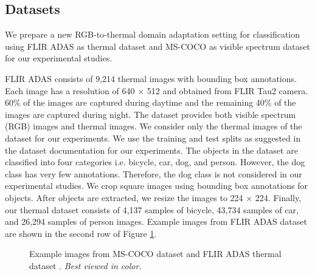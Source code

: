 \documentclass[final]{cvpr}
\begin{document}
\subsection{Datasets}

We prepare a new RGB-to-thermal domain adaptation setting for classification using FLIR ADAS \cite{flir} as thermal dataset and MS-COCO \cite{mscoco} as visible spectrum dataset for our experimental studies.
\vspace{2mm}

\begin{figure*}[ht]
\centering
    \vspace{3mm}
    \caption{The network architectures used for our experimental analyses.}
    \label{fig:architecture}
\end{figure*}

FLIR ADAS \cite{flir} consists of 9,214 thermal images with bounding box annotations. Each image has a resolution of 640 $ \times $ 512 and obtained from FLIR Tau2 camera. 60\% of the images are captured during daytime and the remaining 40\% of the images are captured during night. The dataset provides both visible spectrum (RGB) images and thermal images. We consider only the thermal images of the dataset for our experiments. We use the training and test splits as suggested in the dataset documentation for our experiments. The objects in the dataset are classified into four categories i.e. bicycle, car, dog, and person. However, the dog class has very few annotations. Therefore, the dog class is not considered in our experimental studies. We crop square images using bounding box annotations for objects. After objects are extracted, we resize the images to 224 $ \times $ 224. Finally, our thermal dataset consists of 4,137 samples of bicycle, 43,734 samples of car, and 26,294 samples of person images. Example images from FLIR ADAS dataset are shown in the second row of Figure \ref{fig:dataset}.

\begin{figure}[t]
\centering
{}
\vspace{2mm}
\caption{Example images from MS-COCO dataset \cite{mscoco} and FLIR ADAS thermal dataset \cite{flir}. \textit{Best viewed in color}.}
\label{fig:dataset}
\end{figure}

\begin{figure*}[ht]
\centering
    \vspace{3mm}
    \caption{The t-SNE visualization of network activations on target thermal domain generated by source only model (a), our base method ADDA \cite{adda} (b), our proposed method SGADA with classifier confidences only (c), and our proposed method SGADA with classifier and discriminator confidences (d). \textit{Best viewed in color}.}
    \label{fig:tsne}
\end{figure*}
\end{document}
